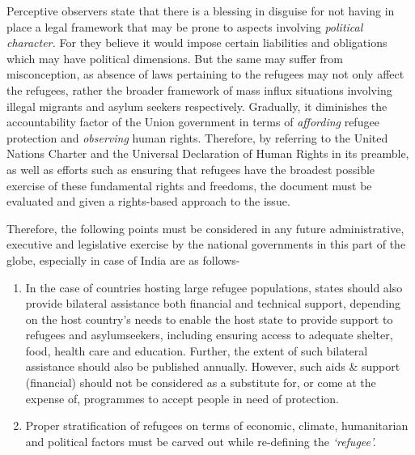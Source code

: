 \begin{multicols}{2}

\noi
Perceptive observers state that there is a blessing in disguise for not having in place a legal
framework that may be prone to aspects involving \textit{political character.} For they believe it
would impose certain liabilities and obligations which may have political dimensions. But the
same may suffer from misconception, as absence of laws pertaining to the refugees may not
only affect the refugees, rather the broader framework of mass influx situations involving
illegal migrants and asylum seekers respectively. Gradually, it diminishes the accountability
factor of the Union government in terms of \textit{affording} refugee protection and \textit{observing} human rights. Therefore, by referring to the United Nations Charter and the Universal Declaration of
Human Rights in its preamble, as well as efforts such as ensuring that refugees have the
broadest possible exercise of these fundamental rights and freedoms, the document must be
evaluated and given a rights-based approach to the issue.



\vspace{-.15cm}

\noi
Therefore, the following points must be considered in any future administrative, executive
and legislative exercise by the national governments in this part of the globe, especially in
case of India are as follows-

\vspace{-.2cm}

\begin{enumerate}[label=$\bullet$]
\item In the case of countries hosting large refugee populations, states should also provide
bilateral assistance both financial and technical support, depending on the host
country’s needs to enable the host state to provide support to refugees and asylumseekers, including ensuring access to adequate shelter, food, health care and education.
Further, the extent of such bilateral assistance should also be published annually.
However, such aids \& support (financial) should not be considered as a substitute for,
or come at the expense of, programmes to accept people in need of protection.

\item Proper stratification of refugees on terms of economic, climate, humanitarian and
political factors must be carved out while re-defining the \textit{‘refugee’.}


\end{enumerate}
\end{multicols}
